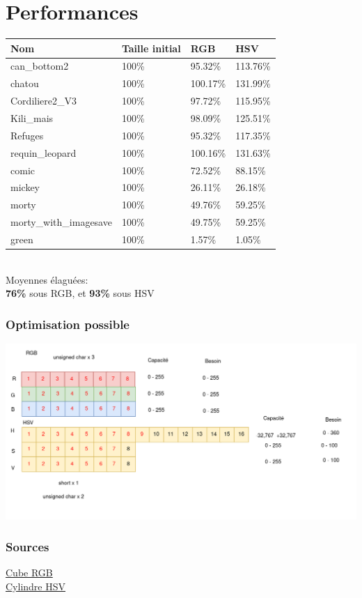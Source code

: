 \documentclass{beamer}
\begin{document}
    \section{Performances}
    \begin{frame}
        \begin{tabular}{l|l|l|l}
          Nom  & Taille initial & RGB & HSV\\
          \hline  
          can\_bottom2 & 100\% & 95.32\% & 113.76\% \\
          \hline
          chatou & 100\% & 100.17\% & 131.99\% \\
          \hline
          Cordiliere2\_V3 & 100\% & 97.72\% & 115.95\% \\
          \hline
          Kili\_mais & 100\% & 98.09\% & 125.51\%  \\
          \hline
          Refuges & 100\% & 95.32\% & 117.35\% \\
          \hline
          requin\_leopard & 100\% & 100.16\% & 131.63\% \\
          \hline
          comic & 100\% & 72.52\% & 88.15\% \\
          \hline
          mickey & 100\% & 26.11\% & 26.18\%\\
          \hline
          morty & 100\% & 49.76\% & 59.25\% \\
          \hline
          morty\_with\_imagesave & 100\% & 49.75\% & 59.25\% \\
          \hline
          green & 100\% & 1.57\% & 1.05\% \\
        \end{tabular}\\
        Moyennes élaguées:\\
        \textbf{76\%} sous RGB, et \textbf{93\%} sous HSV 
    \end{frame}

    \begin{frame}
        \frametitle{Optimisation possible}
        \includegraphics[width=\linewidth]{img/fig12.png}
    \end{frame}

    

    \begin{frame}
        \frametitle{Sources}
        \href{https://commons.wikimedia.org/wiki/File:RGB_color_solid_cube.png}{Cube RGB}\\
        \href{https://en.wikipedia.org/wiki/HSL_and_HSV\#/media/File:HSV_color_solid_cylinder_saturation_gray.png}{Cylindre HSV}


    \end{frame}
\end{document}
